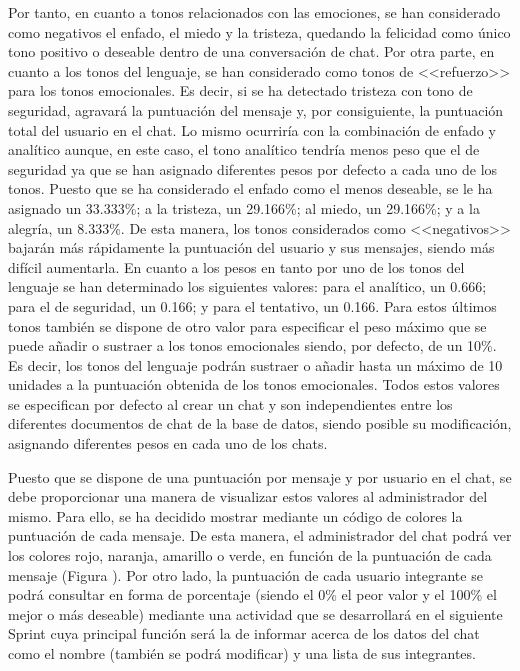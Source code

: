 \clearpage

Por tanto, en cuanto a tonos relacionados con las emociones, se han considerado como negativos el enfado, el miedo y la tristeza, quedando la felicidad como único tono positivo o deseable dentro de una conversación de chat. Por otra parte, en cuanto a los tonos del lenguaje, se han considerado como tonos de <<refuerzo>> para los tonos emocionales. Es decir, si se ha detectado tristeza con tono de seguridad, agravará la puntuación del mensaje y, por consiguiente, la puntuación total del usuario en el chat. Lo mismo ocurriría con la combinación de enfado y analítico aunque, en este caso, el tono analítico tendría menos peso que el de seguridad ya que se han asignado diferentes pesos por defecto a cada uno de los tonos. Puesto que se ha considerado el enfado como el menos deseable, se le ha asignado un 33.333\%; a la tristeza, un 29.166\%; al miedo, un 29.166\%; y a la alegría, un 8.333\%. De esta manera, los tonos considerados como <<negativos>> bajarán más rápidamente la puntuación del usuario y sus mensajes, siendo más difícil aumentarla. En cuanto a los pesos en tanto por uno de los tonos del lenguaje se han determinado los siguientes valores: para el analítico, un 0.666; para el de seguridad, un 0.166; y para el tentativo, un 0.166. Para estos últimos tonos también se dispone de otro valor para especificar el peso máximo que se puede añadir o sustraer a los tonos emocionales siendo, por defecto, de un 10\%. Es decir, los tonos del lenguaje podrán sustraer o añadir hasta un máximo de 10 unidades a la puntuación obtenida de los tonos emocionales. Todos estos valores se especifican por defecto al crear un chat y son independientes entre los diferentes documentos de chat de la base de datos, siendo posible su modificación, asignando diferentes pesos en cada uno de los chats.

Puesto que se dispone de una puntuación por mensaje y por usuario en el chat, se debe proporcionar una manera de visualizar estos valores al administrador del mismo. Para ello, se ha decidido mostrar mediante un código de colores la puntuación de cada mensaje. De esta manera, el administrador del chat podrá ver los colores rojo, naranja, amarillo o verde, en función de la puntuación de cada mensaje (Figura ). Por otro lado, la puntuación de cada usuario integrante se podrá consultar en forma de porcentaje (siendo el 0\% el peor valor y el 100\% el mejor o más deseable) mediante una actividad que se desarrollará en el siguiente Sprint cuya principal función será la de informar acerca de los datos del chat como el nombre (también se podrá modificar) y una lista de sus integrantes.

